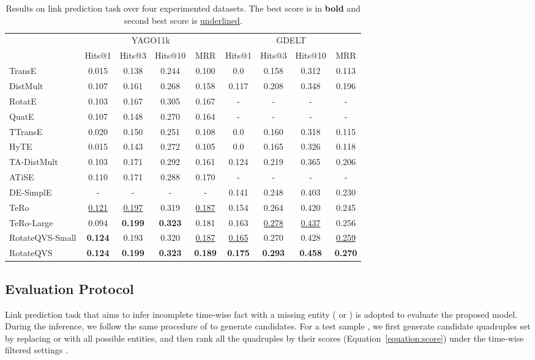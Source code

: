 \documentclass[11pt]{article}
\begin{document}
\begin{table*}[!t]
\begin{tabular}{@{}lcccc|cccc@{}}
\midrule
   & \multicolumn{4}{c|}{YAGO11k}   & \multicolumn{4}{c}{GDELT} \\
\cmidrule{2-9}
   &  Hits@1        & Hits@3  & Hits@10  & MRR & Hits@1        & Hits@3  & Hits@10  & MRR \\
\midrule
TransE      & 0.015 & 0.138 & 0.244 &0.100  & 0.0   & 0.158 & 0.312 & 0.113  \\
DistMult   & 0.107 & 0.161 & 0.268 & 0.158  & 0.117 & 0.208 & 0.348  & 0.196 \\
RotatE       &  0.103  & 0.167 & 0.305 & 0.167         &-    & - & - & -\\
QuatE      &  0.107  & 0.148 & 0.270 & 0.164 &-    & - & - & -\\
\midrule
TTransE   & 0.020 & 0.150 & 0.251 & 0.108 & 0.0           & 0.160 & 0.318 & 0.115\\
HyTE       &  0.015  & 0.143 & 0.272 & 0.105 
& 0.0           & 0.165 & 0.326 & 0.118 \\
TA-DistMult  & 0.103 &0.171 &0.292 & 0.161 & 0.124          & 0.219 & 0.365 & 0.206 \\
ATiSE      & 0.110  & 0.171 & 0.288 & 0.170 &-    & - & - & -\\
DE-SimplE  & -  & -& - & - &  0.141 &0.248 & 0.403 & 0.230  \\
\midrule
TeRo       & \underline{0.121} &\underline{0.197} &0.319 &\underline{0.187} & 0.154   & 0.264  & 0.420  & 0.245  \\
TeRo-Large       & 0.094 & \bfseries 0.199 & \bfseries 0.323 & 0.181 &  0.163          & \underline{0.278} & \underline{0.437} & 0.256 \\
\midrule
RotateQVS-Small & \bfseries 0.124       & 0.193 & 0.320 & \underline{0.187} & \underline{0.165}        & 0.270 & 0.428 & \underline{0.259}\\
RotateQVS & \bfseries 0.124 & \bfseries 0.199 & \bfseries 0.323 & \bfseries0.189 &\bfseries  0.175    &\bfseries 0.293 &\bfseries 0.458 &\bfseries 0.270\\
\bottomrule
\end{tabular}
 \caption{Results on link prediction task over four experimented datasets. The best score is in \textbf{bold} and second best score is \underline{underlined}. 
}
\label{table:results}
\end{table*}

\subsection{Evaluation Protocol}
Link prediction task that aims to infer incomplete time-wise fact with a missing entity ( or ) is adopted to evaluate the proposed model.
During the inference, we follow the same procedure of \citeauthor{xu2020tero} to generate candidates. For a test sample , we first generate candidate quadruples set  by replacing  or  with all possible entities, and then rank all the quadruples by their scores (Equation~\ref{equation:score}) under the time-wise filtered settings \cite{xu2019temporal,goel2020diachronic}.
\end{document}
